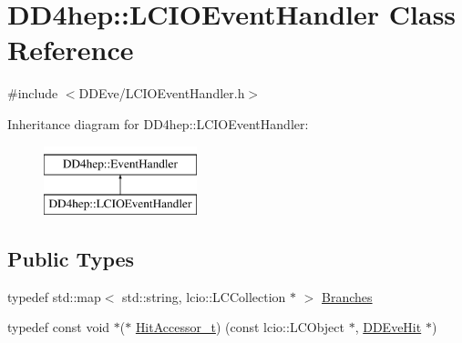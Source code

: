 \hypertarget{class_d_d4hep_1_1_l_c_i_o_event_handler}{}\section{D\+D4hep\+:\+:L\+C\+I\+O\+Event\+Handler Class Reference}
\label{class_d_d4hep_1_1_l_c_i_o_event_handler}


{\ttfamily \#include $<$D\+D\+Eve/\+L\+C\+I\+O\+Event\+Handler.\+h$>$}

Inheritance diagram for D\+D4hep\+:\+:L\+C\+I\+O\+Event\+Handler\+:\begin{figure}[H]
\begin{center}
\leavevmode
\includegraphics[height=2.000000cm]{class_d_d4hep_1_1_l_c_i_o_event_handler}
\end{center}
\end{figure}
\subsection*{Public Types}
\begin{DoxyCompactItemize}
\item 
typedef std\+::map$<$ std\+::string, lcio\+::\+L\+C\+Collection $\ast$ $>$ \hyperlink{class_d_d4hep_1_1_l_c_i_o_event_handler_abb97052600fb229e9fdc6cfeefdc4177}{Branches}
\item 
typedef const void $\ast$($\ast$ \hyperlink{class_d_d4hep_1_1_l_c_i_o_event_handler_a11cc45d455e96d50c653d2a722f5e589}{Hit\+Accessor\+\_\+t}) (const lcio\+::\+L\+C\+Object $\ast$, \hyperlink{class_d_d4hep_1_1_d_d_eve_hit}{D\+D\+Eve\+Hit} $\ast$)
\end{DoxyCompactItemize}
